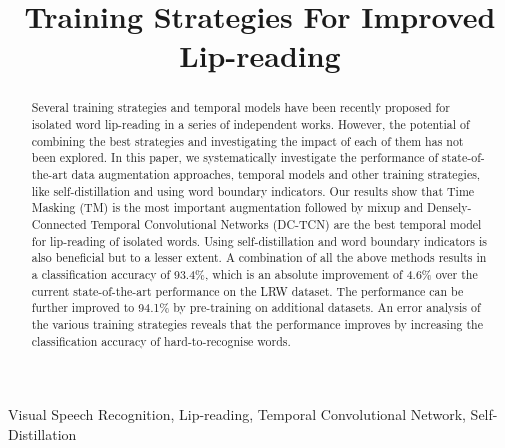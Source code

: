 \documentclass{article}
\title{Training Strategies For Improved Lip-reading}
\begin{document}
\maketitle
\begin{abstract}
Several training strategies and temporal models have been recently proposed for isolated word lip-reading in a series of independent works. However, the potential of combining the best strategies and investigating the impact of each of them has not been explored. In this paper, we systematically investigate the performance of state-of-the-art data augmentation approaches, temporal models and other training strategies, like self-distillation and using word boundary indicators. Our results show that Time Masking (TM) is the most important augmentation followed by mixup and Densely-Connected Temporal Convolutional Networks (DC-TCN) are the best temporal model for lip-reading of isolated words. Using self-distillation and word boundary indicators is also beneficial but to a lesser extent. A combination of all the above methods results in a classification accuracy of 93.4\%, which is an absolute improvement of 4.6\% over the current state-of-the-art performance on the LRW dataset. The performance can be further improved to 94.1\% by pre-training on additional datasets. An error analysis of the various training strategies reveals that the performance improves by increasing the classification accuracy of hard-to-recognise words.

\end{abstract}
\begin{keywords}
Visual Speech Recognition, Lip-reading, Temporal Convolutional Network, Self-Distillation
\end{keywords}
\vspace{-0.3cm}
\end{document}
